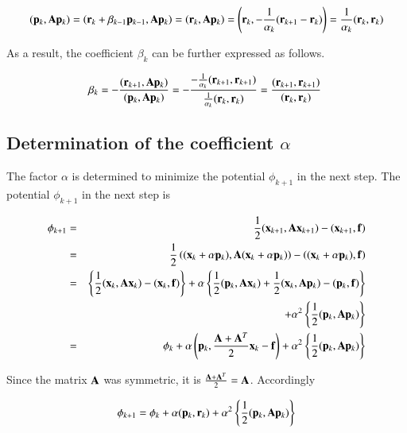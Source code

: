 \begin{equation}
(\mathbf{p}_k,\mathbf{A}\mathbf{p}_k)=\left(\mathbf{r}_k+\beta_{k-1}\mathbf{p}_{k-1},\mathbf{A}\mathbf{p}_k\right)=\left(\mathbf{r}_k,\mathbf{A}\mathbf{p}_k\right)=\left(\mathbf{r}_k,-\frac{1}{\alpha_k}(\mathbf{r}_{k+1}-\mathbf{r}_k)\right)=\frac{1}{\alpha_k}(\mathbf{r}_k,\mathbf{r}_k)
\end{equation}

As a result, the coefficient $\beta_k$ can be further expressed as follows.


\begin{equation}
\beta_k=-\frac{(\mathbf{r}_{k+1},\mathbf{A}\mathbf{p}_k)}{(\mathbf{p}_k,\mathbf{A}\mathbf{p}_k)}=-\frac{-\frac{1}{\alpha_k}(\mathbf{r}_{k+1},\mathbf{r}_{k+1})}{\frac{1}{\alpha_k}(\mathbf{r}_k,\mathbf{r}_k)}=\frac{(\mathbf{r}_{k+1},\mathbf{r}_{k+1})}{(\mathbf{r}_k,\mathbf{r}_k)}~
\end{equation}





\subsection{Determination of the coefficient $\alpha$}


The factor $\alpha$ is determined to minimize the potential $\phi_{k+1}$ in the next step.
The potential $\phi_{k+1}$ in the next step is

\begin{eqnarray}
\phi_{k+1} &=& \frac{1}{2}(\mathbf{x}_{k+1},\mathbf{A}\mathbf{x}_{k+1})-(\mathbf{x}_{k+1},\mathbf{f})\\
&=& \frac{1}{2}\left((\mathbf{x}_k+\alpha\mathbf{p}_k),\mathbf{A}(\mathbf{x}_k+\alpha\mathbf{p}_k)\right)-\left((\mathbf{x}_k+\alpha\mathbf{p}_k),\mathbf{f}\right)\\
&=& \left\{\frac{1}{2}(\mathbf{x}_k,\mathbf{A}\mathbf{x}_k)-(\mathbf{x}_k,\mathbf{f})\right\} + \alpha\left\{\frac{1}{2}(\mathbf{p}_k,\mathbf{A}\mathbf{x}_k)+\frac{1}{2}(\mathbf{x}_k,\mathbf{A}\mathbf{p}_k)-(\mathbf{p}_k,\mathbf{f})\right\}\\
&& + \alpha^2\left\{\frac{1}{2}(\mathbf{p}_k,\mathbf{A}\mathbf{p}_k)\right\}\\
&=& \phi_k+\alpha\left(\mathbf{p}_k,\frac{\mathbf{A}+\mathbf{A}^T}{2}\mathbf{x}_k-\mathbf{f}\right)+\alpha^2\left\{\frac{1}{2}(\mathbf{p}_k,\mathbf{A}\mathbf{p}_k)\right\}
\end{eqnarray}


Since the matrix $\mathbf{A}$ was symmetric, it is $\frac{\mathbf{A}+\mathbf{A}^T}{2}=\mathbf{A}$. Accordingly

\begin{eqnarray}
\phi_{k+1} = \phi_k+\alpha(\mathbf{p}_k,\mathbf{r}_k)+\alpha^2\left\{\frac{1}{2}(\mathbf{p}_k,\mathbf{A}\mathbf{p}_k)\right\}
\end{eqnarray}


